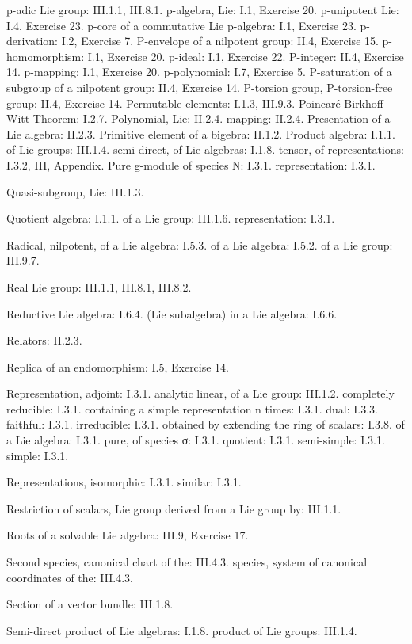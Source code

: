 p-adic Lie group: III.1.1, III.8.1. p-algebra, Lie: I.1, Exercise 20. p-unipotent Lie: I.4, Exercise 23. p-core of a commutative Lie p-algebra: I.1, Exercise 23. p-derivation: I.2, Exercise 7. P-envelope of a nilpotent group: II.4, Exercise 15. p-homomorphism: I.1, Exercise 20. p-ideal: I.1, Exercise 22. P-integer: II.4, Exercise 14. p-mapping: I.1, Exercise 20. p-polynomial: I.7, Exercise 5. P-saturation of a subgroup of a nilpotent group: II.4, Exercise 14. P-torsion group, P-torsion-free group: II.4, Exercise 14. Permutable elements: I.1.3, III.9.3. Poincaré-Birkhoff-Witt Theorem: I.2.7. Polynomial, Lie: II.2.4. mapping: II.2.4. Presentation of a Lie algebra: II.2.3. Primitive element of a bigebra: II.1.2. Product algebra: I.1.1. of Lie groups: III.1.4. semi-direct, of Lie algebras: I.1.8. tensor, of representations: I.3.2, III, Appendix. Pure g-module of species N: I.3.1. representation: I.3.1.

Quasi-subgroup, Lie: III.1.3.

Quotient algebra: I.1.1. of a Lie group: III.1.6. representation: I.3.1.

Radical, nilpotent, of a Lie algebra: I.5.3. of a Lie algebra: I.5.2. of a Lie group: III.9.7.

Real Lie group: III.1.1, III.8.1, III.8.2.

Reductive Lie algebra: I.6.4. (Lie subalgebra) in a Lie algebra: I.6.6.

Relators: II.2.3.

Replica of an endomorphism: I.5, Exercise 14.

Representation, adjoint: I.3.1. analytic linear, of a Lie group: III.1.2. completely reducible: I.3.1. containing a simple representation n times: I.3.1. dual: I.3.3. faithful: I.3.1. irreducible: I.3.1. obtained by extending the ring of scalars: I.3.8. of a Lie algebra: I.3.1. pure, of species σ: I.3.1. quotient: I.3.1. semi-simple: I.3.1. simple: I.3.1.

Representations, isomorphic: I.3.1. similar: I.3.1.

Restriction of scalars, Lie group derived from a Lie group by: III.1.1.

Roots of a solvable Lie algebra: III.9, Exercise 17.

Second species, canonical chart of the: III.4.3. species, system of canonical coordinates of the: III.4.3.

Section of a vector bundle: III.1.8.

Semi-direct product of Lie algebras: I.1.8. product of Lie groups: III.1.4.

